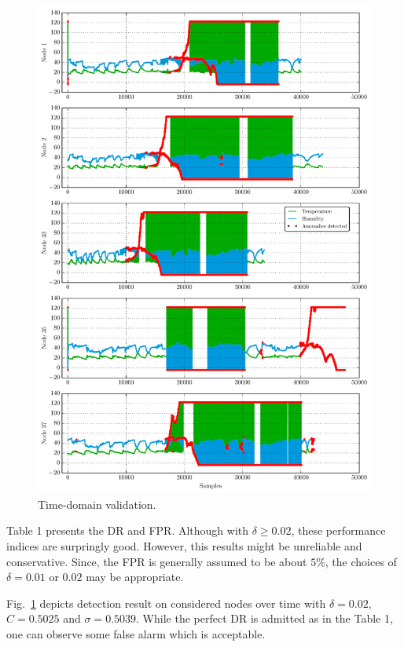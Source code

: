 \documentclass[conference]{IEEEtran}
\theoremstyle{problemstyle}
\begin{document}
\begin{figure}[H]
\centering
\includegraphics[scale=.42]{Figs/time_validation.pdf}
\caption{Time-domain validation.}
\label{fig:time_valid}
\end{figure}

Table 1 presents the DR and FPR. Although with $\delta \ge 0.02$, these performance indices are surpringly good. However, this results might be unreliable and conservative. Since, the FPR is generally assumed to be about $5 \%$, the choices of $\delta=0.01$ or $0.02$ may be appropriate. 

Fig.~\ref{fig:time_valid} depicts detection result on considered nodes over time with $\delta=0.02$, $C=0.5025$ and $\sigma=0.5039$. While the perfect DR is admitted as in the Table 1, one can observe some false alarm which is acceptable.
\end{document}
